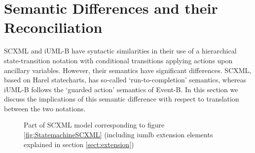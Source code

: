 
\section{Semantic Differences and their Reconciliation}
\label{sect:diff}


SCXML and iUML-B have syntactic similarities in their use of a hierarchical state-transition notation with conditional transitions applying actions upon ancillary variables.
However, their semantics have significant differences. SCXML, based on Harel statecharts, has so-called `run-to-completion' semantics, whereas iUML-B follows the `guarded action' semantics of Event-B.
In this section we discuss the implications of this semantic difference with respect to translation between the two notations.


\begin{figure}[tbp!]
  \caption{Part of SCXML model corresponding to figure \ref{fig:StatemachineSCXML} 
   (including iumlb extension elements explained in section \ref{sect:extension}) } 
  \label{fig:scxml}
\end{figure}

